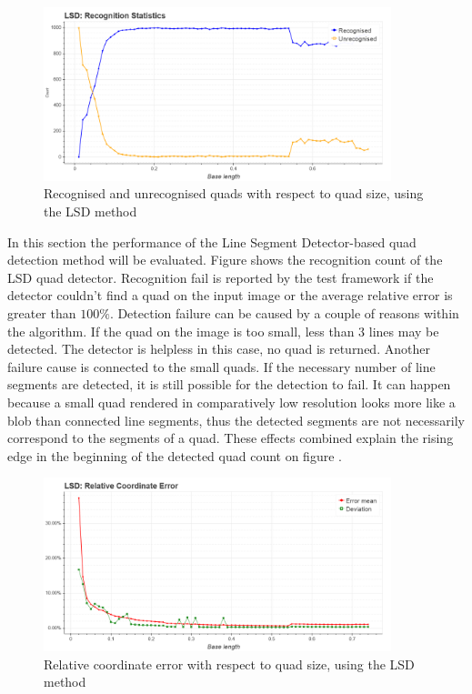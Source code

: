\begin{figure}[t]
	\centering
	\includegraphics[width=0.9\textwidth]{figures/plots/lsd_rec_unrec_count.png}
	\caption{Recognised and unrecognised quads with respect to quad size, using the LSD method}
	\label{fig:lsdRecCnt}
\end{figure}
In this section the performance of the Line Segment Detector-based quad detection method will be evaluated.
Figure  shows the recognition count of the LSD quad detector.
Recognition fail is reported by the test framework if the detector couldn't find a quad on the input image or the average relative error is greater than $100\%$.
Detection failure can be caused by a couple of reasons within the algorithm.
If the quad on the image is too small, less than 3 lines may be detected.
The detector is helpless in this case, no quad is returned.
Another failure cause is connected to the small quads.
If the necessary number of line segments are detected, it is still possible for the detection to fail.
It can happen because a small quad rendered in comparatively low resolution looks more like a blob than connected line segments, thus the detected segments are not necessarily correspond to the segments of a quad.
These effects combined explain the rising edge in the beginning of the detected quad count on figure .
\begin{figure}[t]
	\centering
	\includegraphics[width=0.9\textwidth]{figures/plots/lsd_relative_coordinate_error.png}
	\caption{Relative coordinate error with respect to quad size, using the LSD method}
	\label{fig:lsdRelCoordErr}
\end{figure}


